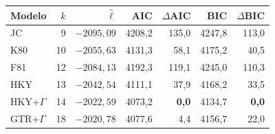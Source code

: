 \begin{tabular}{@{}lrrrrrr@{}}
\toprule
\textbf{Modelo} & $k$ & $\hat\ell$ & AIC & $\Delta$AIC & BIC & $\Delta$BIC\\
\midrule
JC & 9 & $-2095{,}09$ & 4208{,}2 & 135{,}0 & 4247{,}8 & 113{,}0\\
K80 & 10 & $-2055{,}63$ & 4131{,}3 & 58{,}1 & 4175{,}2 & 40{,}5\\
F81 & 12 & $-2084{,}13$ & 4192{,}3 & 119{,}1 & 4245{,}0 & 110{,}3\\
HKY & 13 & $-2042{,}54$ & 4111{,}1 & 37{,}9 & 4168{,}2 & 33{,}5\\
HKY+$\Gamma$ & 14 & $-2022{,}59$ & 4073{,}2 & \textbf{0{,}0} & 4134{,}7 & \textbf{0{,}0}\\
GTR+$\Gamma$ & 18 & $-2020{,}78$ & 4077{,}6 & 4{,}4 & 4156{,}7 & 22{,}0\\
\bottomrule
\end{tabular}
